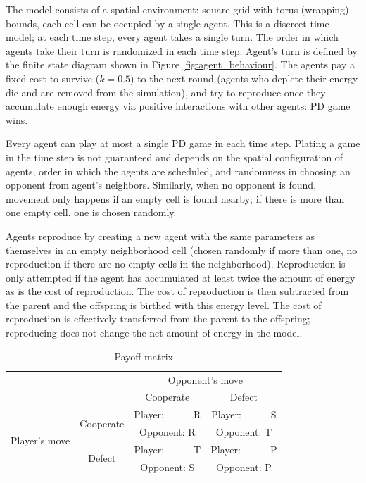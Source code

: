 \documentclass[english]{article}
\begin{document}
The model consists of a spatial environment:
square grid with torus (wrapping) bounds,
each cell can be occupied by a single agent.
This is a discreet time model;
at each time step, every agent takes a single turn.
The order in which agents take their turn is randomized in each time step.
Agent's turn is defined by the finite state diagram shown in Figure \ref{fig:agent_behaviour}.
The agents pay a fixed cost to survive ($k = 0.5$) to the next round (agents who deplete their energy die and are removed from the simulation), and try to reproduce once they accumulate enough energy via positive interactions with other agents: PD game wins.

Every agent can play at most a single PD game in each time step.
Plating a game in the time step is not guaranteed and depends on the spatial configuration of agents, order in which the agents are scheduled, and randomness in choosing an opponent from agent's neighbors.
Similarly, when no opponent is found, movement only happens if an empty cell is found nearby; if there is more than one empty cell, one is chosen randomly.

Agents reproduce by creating a new agent with the same parameters as themselves in an empty neighborhood cell (chosen randomly if more than one, no reproduction if there are no empty cells in the neighborhood).
Reproduction is only attempted if the agent has accumulated at least twice the amount of energy as is the cost of reproduction.
The cost of reproduction is then subtracted from the parent and the offspring is birthed with this energy level.
The cost of reproduction is effectively transferred from the parent to the offspring;
reproducing does not change the net amount of energy in the model.

\begin{table}[h!]
  \centering
  \begin{tabular}{c c||c|c}
    & & \multicolumn{2}{c}{Opponent's move} \\
    & & Cooperate & Defect \\
    \hline\hline

    \multirow{4}{6em}{Player's move}
    & \multirow{2}{5em}{Cooperate}
      & Player:\ \ \ \ \ \ R & Player:\ \ \ \ \ \ S \\
    & & Opponent: R & Opponent: T \\
    \cline{2-4}
    & \multirow{2}{5em}{Defect}
      & Player:\ \ \ \ \ \ T & Player:\ \ \ \ \ \ P \\
    & & Opponent: S & Opponent: P \\
  \end{tabular}

  \caption{Payoff matrix}
  \label{table:payoff}
\end{table}
\end{document}

